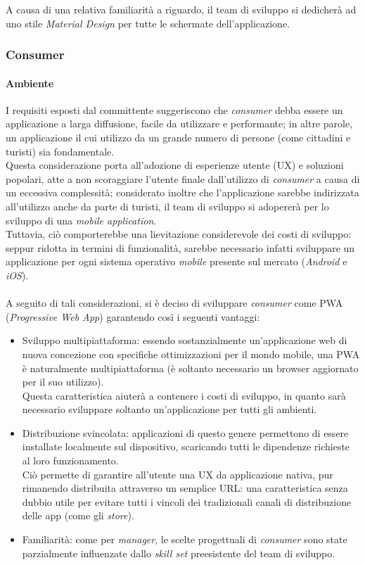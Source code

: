 \documentclass[12pt]{article}
\begin{document}
A causa di una relativa familiarità a riguardo, il team di sviluppo si dedicherà ad uno stile \textit{Material Design} per tutte le schermate dell'applicazione.
\newpage
\subsubsection{Consumer}
\paragraph{Ambiente}
I requisiti esposti dal committente suggeriscono che \textit{consumer} debba essere un applicazione a larga diffusione, facile da utilizzare e performante; in altre parole, un applicazione il cui utilizzo da un grande numero di persone (come cittadini e turisti) sia fondamentale.\\
Questa considerazione porta all'adozione di esperienze utente (UX) e soluzioni popolari, atte a non scoraggiare l'utente finale dall'utilizzo di \textit{consumer} a causa di un eccessiva complessità; considerato inoltre che l'applicazione sarebbe indirizzata all'utilizzo anche da parte di turisti, il team di sviluppo si adopererà per lo sviluppo di una \textit{mobile application}.\\
Tuttavia, ciò comporterebbe una lievitazione considerevole dei costi di sviluppo: seppur ridotta in termini di funzionalità, sarebbe necessario infatti sviluppare un applicazione per ogni sistema operativo \textit{mobile} presente sul mercato (\textit{Android} e \textit{iOS}).\\\\
A seguito di tali considerazioni, si è deciso di sviluppare \textit{consumer} come PWA (\textit{Progressive Web App}) garantendo così i seguenti vantaggi:
\begin{itemize}
\item Sviluppo multipiattaforma: essendo sostanzialmente un'applicazione web di nuova concezione con specifiche ottimizzazioni per il mondo mobile, una PWA è naturalmente multipiattaforma (è soltanto necessario un browser aggiornato per il suo utilizzo).\\
Questa caratteristica aiuterà a contenere i costi di sviluppo, in quanto sarà necessario sviluppare soltanto un'applicazione per tutti gli ambienti.
\item Distribuzione svincolata: applicazioni di questo genere permettono di essere installate localmente sul dispositivo, scaricando tutti le dipendenze richieste al loro funzionamento.\\%
Ciò permette di garantire all'utente una UX da applicazione nativa, pur rimanendo distribuita attraverso un semplice URL: una caratteristica senza dubbio utile per evitare tutti i vincoli dei tradizionali canali di distribuzione delle app (come gli \textit{store}).
\item Familiarità: come per \textit{manager}, le scelte progettuali di \textit{consumer} sono state parzialmente influenzate dallo \textit{skill set} preesistente del team di sviluppo. 
\end{itemize}
\end{document}

